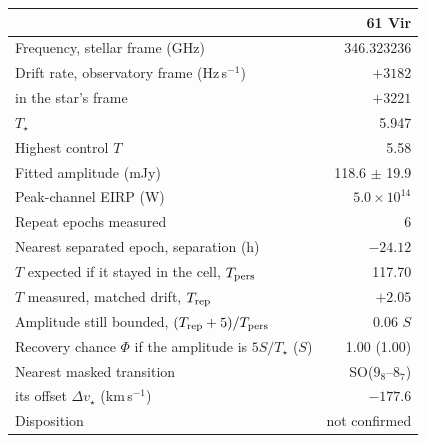 \begin{tabular}{@{}>{\raggedright\arraybackslash}p{}@{~~}r@{}}
\hline
 & 61 Vir \\
\hline
Frequency, stellar frame (GHz) & 346.323236 \\
Drift rate, observatory frame (Hz\,s$^{-1}$) & $+3182$ \\
\quad in the star\textquoteright s frame & $+3221$ \\
$T_\star$ & 5.947 \\
Highest control $T$ & 5.58 \\
Fitted amplitude (mJy) & 118.6 $\pm$ 19.9 \\
Peak-channel EIRP (W) & $5.0 \times 10^{14}$ \\
Repeat epochs measured & 6 \\
Nearest separated epoch, separation (h) & $-24.12$ \\
$T$ expected if it stayed in the cell, $T_{\rm pers}$ & 117.70 \\
$T$ measured, matched drift, $T_{\rm rep}$ & $+2.05$ \\
Amplitude still bounded, $(T_{\rm rep}+5)/T_{\rm pers}$ & 0.06 $S$ \\
Recovery chance $\Phi$ if the amplitude is $5S/T_\star$ ($S$) & 1.00 (1.00) \\
Nearest masked transition & SO($9_{8}$--$8_{7}$) \\
\quad its offset $\Delta v_\star$ (km\,s$^{-1}$) & $-177.6$ \\
Disposition & not confirmed \\
\hline
\end{tabular}

